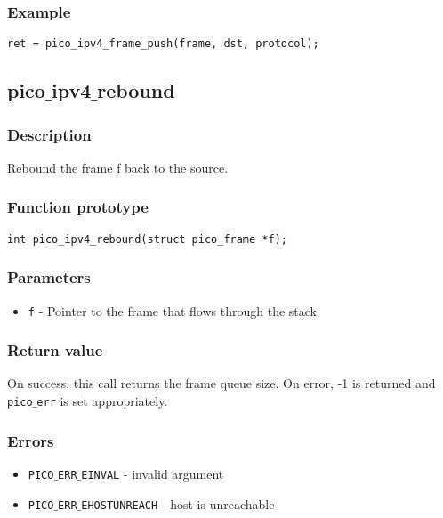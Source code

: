 \subsubsection*{Example}
\begin{verbatim}
ret = pico_ipv4_frame_push(frame, dst, protocol);
\end{verbatim}


\subsection{pico$\_$ipv4$\_$rebound}

\subsubsection*{Description}
Rebound the frame f back to the source.

\subsubsection*{Function prototype}
\begin{verbatim}
int pico_ipv4_rebound(struct pico_frame *f);
\end{verbatim}

\subsubsection*{Parameters}
\begin{itemize}[noitemsep]
\item \texttt{f} - Pointer to the frame that flows through the stack
\end{itemize}

\subsubsection*{Return value}
On success, this call returns the frame queue size.
On error, -1 is returned and \texttt{pico$\_$err} is set appropriately.

\subsubsection*{Errors}
\begin{itemize}[noitemsep]
\item \texttt{PICO$\_$ERR$\_$EINVAL} - invalid argument
\item \texttt{PICO$\_$ERR$\_$EHOSTUNREACH} - host is unreachable
\end{itemize}

